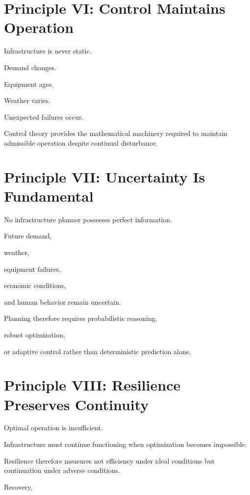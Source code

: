 \documentclass[11pt,fleqn]{book}
\numberwithin{equation}{chapter}
\theoremstyle{plain}
\theoremstyle{definition}
\theoremstyle{remark}
\begin{document}

\section{Principle VI: Control Maintains Operation}

Infrastructure is never static.

Demand changes.

Equipment ages.

Weather varies.

Unexpected failures occur.

Control theory provides the mathematical machinery required to maintain
admissible operation despite continual disturbance.


\section{Principle VII: Uncertainty Is Fundamental}

No infrastructure planner possesses perfect information.

Future demand,

weather,

equipment failures,

economic conditions,

and human behavior remain uncertain.

Planning therefore requires probabilistic reasoning,

robust optimization,

or adaptive control rather than deterministic prediction alone.


\section{Principle VIII: Resilience Preserves Continuity}

Optimal operation is insufficient.

Infrastructure must continue functioning when optimization becomes
impossible.

Resilience therefore measures not efficiency under ideal conditions but
continuation under adverse conditions.

Recovery,
\end{document}
